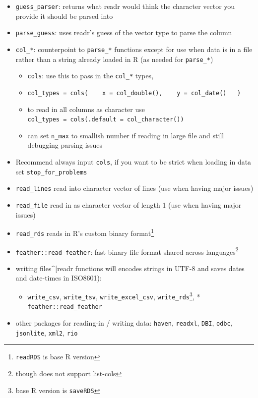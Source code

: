\documentclass[]{book}
\providecommand{\tightlist}{%
  \setlength{\itemsep}{0pt}\setlength{\parskip}{0pt}}
\let\rmarkdownfootnote\footnote%
\def\footnote{\protect\rmarkdownfootnote}
\theoremstyle{definition}
\theoremstyle{definition}
\theoremstyle{definition}
\theoremstyle{remark}
\begin{document}
\begin{itemize}
\tightlist
\item
  \texttt{guess\_parser}: returns what readr would think the character
  vector you provide it should be parsed into
\item
  \texttt{parse\_guess}: uses readr's guess of the vector type to parse
  the column
\item
  \texttt{col\_*}: counterpoint to \texttt{parse\_*} functions except
  for use when data is in a file rather than a string already loaded in
  R (as needed for \texttt{parse\_*})

  \begin{itemize}
  \tightlist
  \item
    \texttt{cols}: use this to pass in the \texttt{col\_*} types,
  \item
    \texttt{col\_types\ =\ cols(\ \ \ \ x\ =\ col\_double(),\ \ \ \ y\ =\ col\_date()\ \ \ )}
  \item
    to read in all columns as character use
    \texttt{col\_types\ =\ cols(.default\ =\ col\_character())}
  \item
    can set \texttt{n\_max} to smallish number if reading in large file
    and still debugging parsing issues
  \end{itemize}
\item
  Recommend always input \texttt{cols}, if you want to be strict when
  loading in data set \texttt{stop\_for\_problems}
\item
  \texttt{read\_lines} read into character vector of lines (use when
  having major issues)
\item
  \texttt{read\_file} read in as character vector of length 1 (use when
  having major issues)
\item
  \texttt{read\_rds} reads in R's custom binary format\footnote{\texttt{readRDS}
    is base R version}
\item
  \texttt{feather::read\_feather}: fast binary file format shared across
  languages\footnote{though does not support list-cols}
\item
  writing files\^{}{[}readr functions will encodes strings in UTF-8 and
  saves dates and date-times in ISO8601):

  \begin{itemize}
  \tightlist
  \item
    \texttt{write\_csv}, \texttt{write\_tsv},
    \texttt{write\_excel\_csv}, \texttt{write\_rds}\footnote{base R
      version is \texttt{saveRDS}}, * \texttt{feather::read\_feather}
  \end{itemize}
\item
  other packages for reading-in / writing data: \texttt{haven},
  \texttt{readxl}, \texttt{DBI}, \texttt{odbc}, \texttt{jsonlite},
  \texttt{xml2}, \texttt{rio}
\end{itemize}
\end{document}
